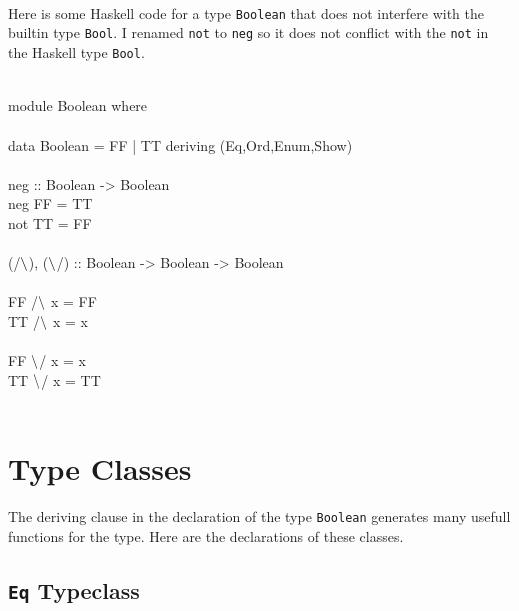\documentclass[11pt]{article}
\begin{document}

\section{}


\ \\
Here is some Haskell code for a type {\tt{Boolean}} that does not interfere with the builtin type {\tt{Bool}}.  I renamed {\tt{not}} to {\tt{neg}} so it does not conflict with the {\tt{not}} in 
the Haskell type {\tt{Bool}}.


\begin{program*}
\>    \\
\> module Boolean where     \\
\>    \\
\> data Boolean = FF | TT             deriving (Eq,Ord,Enum,Show)   \\
\>    \\
\> neg :: Boolean -> Boolean   \\
\> neg FF  = TT   \\
\> not TT = FF   \\
\>    \\
\> (/$\bf\backslash$), ($\bf\backslash$/) :: Boolean -> Boolean -> Boolean   \\
\>    \\
\> FF /$\bf\backslash$ x = FF   \\
\> TT /$\bf\backslash$ x = x   \\
\>    \\
\> FF $\bf\backslash$/ x = x   \\
\> TT $\bf\backslash$/ x = TT   \\
\>    \\
\end{program*} 



\section{Type Classes}
The deriving clause in the declaration of the type {\tt{Boolean}} generates
many usefull functions for the type. Here are the declarations of these classes.

\subsection{{\tt{Eq}} Typeclass}
\end{document}
